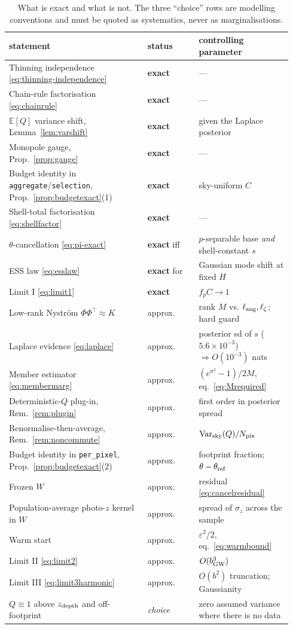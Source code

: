 \begin{table}[h]
\centering\small
\begin{tabular}{p{0.46\linewidth}p{0.17\linewidth}p{0.31\linewidth}}
\toprule
statement & status & controlling parameter\\
\midrule
Thinning independence \eqref{eq:thinning-independence} & \textbf{exact} & --- \\
Chain-rule factorisation \eqref{eq:chainrule} & \textbf{exact} & --- \\
$\mathbb E[Q]$ variance shift, Lemma~\ref{lem:varshift} & \textbf{exact} & given the Laplace posterior \\
Monopole gauge, Prop.~\ref{prop:gauge} & \textbf{exact} & --- \\
Budget identity in \texttt{aggregate}/\texttt{selection}, Prop.~\ref{prop:budgetexact}(1) & \textbf{exact} & sky-uniform $C$ \\
Shell-total factorisation \eqref{eq:shellfactor} & \textbf{exact} & --- \\
$\theta$-cancellation \eqref{eq:pi-exact} & \textbf{exact} iff & $p$-separable base \emph{and} shell-constant $s$ \\
ESS law \eqref{eq:esslaw} & \textbf{exact} for & Gaussian mode shift at fixed $H$ \\
Limit I \eqref{eq:limit1} & \textbf{exact} & $f_pC\to1$ \\
\midrule
Low-rank Nystr\"om $\Phi\Phi^{\!\top}\!\approx\!K$ & approx. & rank $M$ vs. $\ell_{\rm ang},\ell_\zeta$; hard guard \\
Laplace evidence \eqref{eq:laplace} & approx. & posterior sd of $s$ ($5.6\times10^{-3}$) $\Rightarrow O(10^{-3})$ nats \\
Member estimator \eqref{eq:membermarg} & approx. & $(e^{\sigma^2}\!-\!1)/2M$, eq.~\eqref{eq:Mrequired} \\
Deterministic-$Q$ plug-in, Rem.~\ref{rem:plugin} & approx. & first order in posterior spread \\
Renormalise-then-average, Rem.~\ref{rem:noncommute} & approx. & $\mathrm{Var}_{\rm sky}(Q)/N_{\rm pix}$ \\
Budget identity in \texttt{per\_pixel}, Prop.~\ref{prop:budgetexact}(2) & approx. & footprint fraction; $\theta-\theta_{\rm ref}$ \\
Frozen $W$ & approx. & residual \eqref{eq:cancelresidual} \\
Population-average photo-$z$ kernel in $W$ & approx. & spread of $\sigma_z$ across the sample \\
Warm start & approx. & $\varepsilon^2/2$, eq.~\eqref{eq:warmbound} \\
Limit II \eqref{eq:limit2} & approx. & $O(b_{\rm GW}^3)$ \\
Limit III \eqref{eq:limit3harmonic} & approx. & $O(b^2)$ truncation; Gaussianity \\
$Q\equiv1$ above $z_{\rm depth}$ and off-footprint & \emph{choice} & zero assumed variance where there is no data \\
\bottomrule
\end{tabular}
\caption{What is exact and what is not.  The three ``choice'' rows are
modelling conventions and must be quoted as systematics, never as
marginalisations.}
\end{table}
